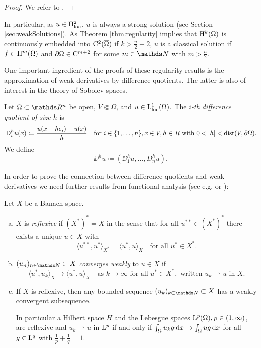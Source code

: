 \begin{proof}
  We refer to \cite[Theorems 1--6 in Section 6.3 and Theorem 6 in Section 6.2]{evans2010partial}.
\end{proof}

In particular, as $u \in \mathrm{H}_{\operatorname{loc}}^2$, $u$ is always a strong solution (see Section \ref{sec:weakSolutions}).
As Theorem \ref{thm:regularity} implies that $\mathrm{H}^k(\Omega)$ is continuously embedded into $\mathrm{C}^2(\overline\Omega)$ if $k > \frac{n}{2} + 2$, $u$ is a classical solution if $f \in \mathrm{H}^m(\Omega)$ and $\partial\Omega \in \mathrm{C}^{m + 2}$ for some $m \in \N$ with $m > \frac{n}{2}$.

One important ingredient of the proofs of these regularity results is the approximation of weak derivatives by difference quotients.
The latter is also of interest in the theory of Sobolev spaces.

\begin{defn}
  Let $\Omega \subset \R^n$ be open, $V \Subset \Omega$, and $u \in \mathrm{L}^1_{\operatorname{loc}}(\Omega)$.
  The \emph{$i$-th difference quotient of size $h$} is
  $$
  \,{\operatorname{D}}_i^h u(x) \coloneqq \frac{u(x + he_i) - u(x)}{h} \quad\text{for } i \in \{1, \dots,n\}, x \in V, h \in R \text{ with } 0 < |h| < \operatorname{dist}(V, \partial \Omega).
  $$
  We define
  $$
  \DD^h u\coloneqq ( \DD_1^h u, \dots,D_n^h u).
  $$
\end{defn}

In order to prove the connection between difference quotients and weak derivatives we need further results from functional analysis (see e.g. \cite{dobrowolski2010angewandte} or \cite{alt2012lineare}):

\begin{prop}
  \label{prop:banachAlaoglu}
  Let $X$ be a Banach space.
  \begin{enumerate}[a)]
    \item $X$ is \emph{reflexive} if $(X^*)^* = X$ in the sense that for all $u^{**} \in (X^*)^*$ there exists a unique $u \in X$ with
      $$
      \langle u^{**}, u^* \rangle_{X^*} = \langle u^*, u \rangle_X \quad\text{for all } u^* \in X^*.
      $$
    \item $(u_n)_{n \in \N} \subset X$ \emph{converges weakly} to $u \in X$ if 
      $$
      \langle u^*, u_k \rangle_X \to \langle u^*, u \rangle_X \quad\text{as } k\to \infty \text{ for all } u^* \in X^*, \text{ written } u_k \rightharpoonup u \text{ in } X.
      $$
    \item If $X$ is reflexive, then any bounded sequence $(u_k)_{k \in \N} \subset X$ has a weakly convergent subsequence.

      In particular a Hilbert space $H$ and the Lebesgue spaces $\mathrm{L}^p(\Omega), p \in (1,\infty)$, are reflexive and $u_k \rightharpoonup u$ in $\mathrm{L}^p$ if and only if $\int_\Omega u_k g \, {\operatorname{d}\!{x}} \to \int_\Omega u g \, {\operatorname{d}\!{x}}$ for all $g \in \mathrm{L}^q$ with $\frac{1}{p} + \frac{1}{q} = 1$.
  \end{enumerate}
\end{prop}

